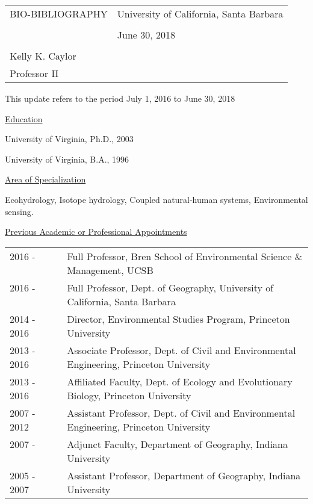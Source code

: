 \documentclass[10pt]{article}
\begin{document}
\noindent
\begin{tabularx}{\linewidth}{XX} 
BIO-BIBLIOGRAPHY & \hfill University of California, Santa Barbara \\ \\
 & \hfill June 30, 2018 \\ \\
 Kelly K. Caylor &   \\ 
 Professor II & 
 \end{tabularx}

\vspace{1cm}

This update refers to the period July 1, 2016 to June 30, 2018

\vspace{1cm}

\raggedright

\vspace{0.5cm}
\underline{Education}

University of Virginia, Ph.D., 2003

University of Virginia, B.A., 1996

\vspace{0.5cm}
\underline{Area of Specialization}

Ecohydrology, Isotope hydrology, Coupled natural-human systems, Environmental sensing.

\vspace{0.5cm}
\underline{Previous Academic or Professional Appointments}
\begin{tabular}{l p{5.5in} }
2016 - \ \ \ \ & Full Professor, Bren School of Environmental Science \& Management, UCSB \\ 
2016 - \ \ \ \ & Full Professor, Dept. of Geography, University of California, Santa Barbara \\ 
2014 - 2016 & Director, Environmental Studies Program, Princeton University \\
2013 - 2016 & Associate Professor, Dept. of Civil and Environmental Engineering, Princeton University \\
2013 - 2016 & Affiliated Faculty, Dept. of Ecology and Evolutionary Biology, Princeton University \\
2007 - 2012 \ \ \ \ & Assistant Professor, Dept. of Civil and Environmental Engineering, Princeton University \\
2007 - \ \ \ \ & Adjunct Faculty, Department of Geography, Indiana University \\ 
2005 - 2007 \ \ \ \  & Assistant Professor, Department of Geography, Indiana University \\
\end{tabular}
\end{document}
